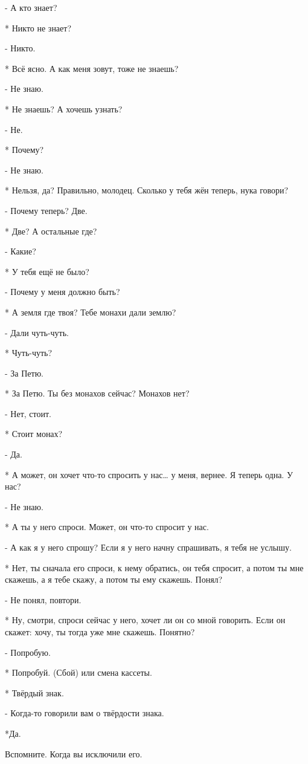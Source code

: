 - А кто знает?

* Никто не знает?

- Никто.

* Всё ясно. А как меня зовут, тоже не знаешь?

- Не знаю.

* Не знаешь? А хочешь узнать?

- Не.

* Почему?

- Не знаю.

* Нельзя, да? Правильно, молодец. Сколько у тебя жён теперь, нука  говори?

- Почему теперь? Две.

* Две? А остальные где?

- Какие?

* У тебя ещё не было?

- Почему у меня должно быть?

* А земля где твоя? Тебе монахи дали землю?

- Дали чуть-чуть.

* Чуть-чуть?

- За Петю.

* За Петю. Ты без монахов сейчас? Монахов нет?

- Нет, стоит.

* Стоит монах?

- Да.

* А может, он хочет что-то спросить у нас… у меня, вернее. Я теперь одна. У нас?

- Не знаю.

* А ты у него спроси. Может, он что-то спросит у нас.

- А как я у него спрошу? Если я у него начну спрашивать, я тебя не услышу.

* Нет, ты сначала его спроси, к нему обратись, он тебя спросит, а потом ты мне скажешь, а я тебе скажу, а потом ты ему скажешь. Понял?

- Не понял, повтори.

* Ну, смотри, спроси сейчас у него, хочет ли он со мной говорить. Если он скажет: хочу, ты тогда уже мне скажешь. Понятно?

- Попробую.

* Попробуй. 
(Сбой) или смена кассеты.

* Твёрдый знак.

- Когда-то говорили вам о твёрдости знака. 

*Да.

Вспомните. Когда вы исключили его.

